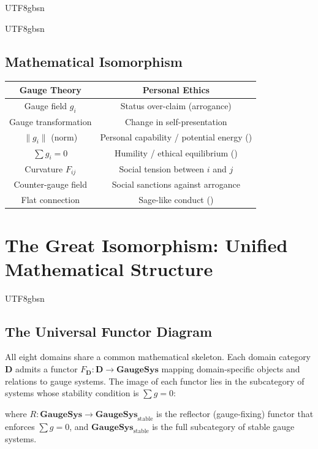\documentclass[11pt,a4paper]{article}
\begin{document}
\begin{CJK}{UTF8}{gbsn}
{\begin{CJK}{UTF8}{gbsn}
\subsection{Mathematical Isomorphism}
\begin{center}
\begin{tabular}{c|c}
    \textbf{Gauge Theory} & \textbf{Personal Ethics} \\
    \hline
    Gauge field $g_i$ & Status over-claim (arrogance) \\
    Gauge transformation & Change in self-presentation \\
    $\|g_i\|$ (norm) & Personal capability / potential energy () \\
    $\sum g_i = 0$ & Humility / ethical equilibrium () \\
    Curvature $F_{ij}$ & Social tension between $i$ and $j$ \\
    Counter-gauge field & Social sanctions against arrogance \\
    Flat connection & Sage-like conduct () \\
\end{tabular}
\end{center}
\end{CJK}
\section{The Great Isomorphism: Unified Mathematical Structure}
\label{sec:isomorphism}
\begin{CJK}{UTF8}{gbsn}
\subsection{The Universal Functor Diagram}
All eight domains share a common mathematical skeleton. Each domain category
$\mathbf{D}$ admits a functor $F_{\mathbf{D}}: \mathbf{D} \to \mathbf{GaugeSys}$
mapping domain-specific objects and relations to gauge systems. The image of each
functor lies in the subcategory of systems whose stability condition is $\sum g = 0$:
\begin{center}
\end{center}
\noindent
where $R: \mathbf{GaugeSys} \to \mathbf{GaugeSys}_{\text{stable}}$ is the reflector
(gauge-fixing) functor that enforces $\sum g = 0$, and $\mathbf{GaugeSys}_{\text{stable}}$
is the full subcategory of stable gauge systems.

\end{CJK}}
\end{CJK}
\end{document}
